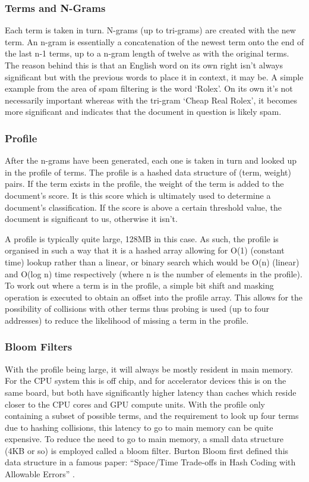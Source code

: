 \subsubsection{Terms and N-Grams}

Each term is taken in turn. N-grams (up to tri-grams) are created with the new
term. An n-gram is essentially a concatenation of the newest term onto the end
of the last n-1 terms, up to a n-gram length of twelve as with the original
terms. The reason behind this is that an English word on its own right isn't
always significant but with the previous words to place it in context, it may
be. A simple example from the area of spam filtering is the word `Rolex'. On its
own it's not necessarily important whereas with the tri-gram `Cheap Real Rolex',
it becomes more significant and indicates that the document in question is
likely spam.

\subsubsection{Profile}

After the n-grams have been generated, each one is taken in turn and looked up
in the profile of terms. The profile is a hashed data structure of (term,
weight) pairs. If the term exists in the profile, the weight of the term is
added to the document's score. It is this score which is ultimately used to
determine a document's classification. If the score is above a certain threshold
value, the document is significant to us, otherwise it isn't.

A profile is typically quite large, 128MB in this case. As such, the profile is
organised in such a way that it is a hashed array allowing for O(1) (constant
time) lookup rather than a linear, or binary search which would be O(n) (linear)
and O(log n) time respectively (where n is the number of elements in the
profile). To work out where a term is in the profile, a simple bit shift and
masking operation is executed to obtain an offset into the profile array. This
allows for the possibility of collisions with other terms thus probing is used
(up to four addresses) to reduce the likelihood of missing a term in the
profile.

\subsubsection{Bloom Filters}

With the profile being large, it will always be mostly resident in main memory.
For the CPU system this is off chip, and for accelerator devices this is on the
same board, but both have significantly higher latency than caches which reside
closer to the CPU cores and GPU compute units. With the profile only containing
a subset of possible terms, and the requirement to look up four terms due to
hashing collisions, this latency to go to main memory can be quite expensive. To
reduce the need to go to main memory, a small data structure (4KB or so) is
employed called a bloom filter. Burton Bloom first defined this data structure
in a famous paper: ``Space/Time Trade-offs in Hash Coding with Allowable
Errors'' \cite{bloom1970space}.


